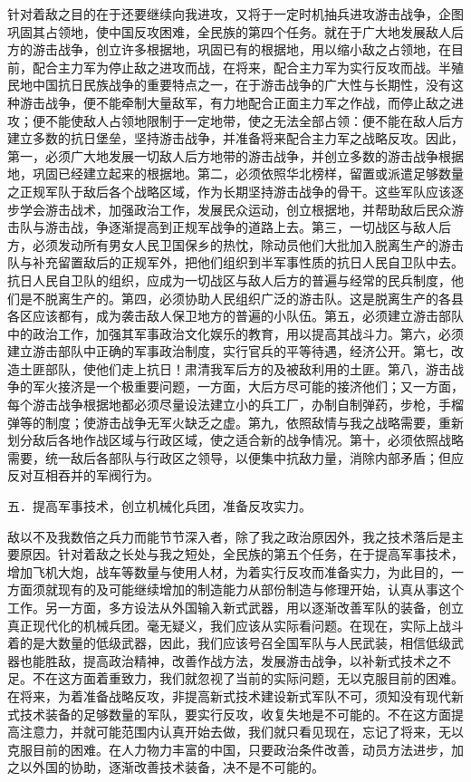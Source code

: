 针对着敌之目的在于还要继续向我进攻，又将于一定时机抽兵进攻游击战争，企图巩固其占领地，使中国反攻困难，全民族的第四个任务。就在于广大地发展敌人后方的游击战争，创立许多根据地，巩固已有的根据地，用以缩小敌之占领地，在目前，配合主力军为停止敌之进攻而战，在将来，配合主力军为实行反攻而战。半殖民地中国抗日民族战争的重要特点之一，在于游击战争的广大性与长期性，没有这种游击战争，便不能牵制大量敌军，有力地配合正面主力军之作战，而停止敌之进攻；便不能使敌人占领地限制于一定地带，使之无法全部占领：便不能在敌人后方建立多数的抗日堡垒，坚持游击战争，并准备将来配合主力军之战略反攻。因此，第一，必须广大地发展一切敌人后方地带的游击战争，并创立多数的游击战争根据地，巩固已经建立起来的根据地。第二，必须依照华北榜样，留置或派遣足够数量之正规军队于敌后各个战略区域，作为长期坚持游击战争的骨干。这些军队应该逐步学会游击战术，加强政治工作，发展民众运动，创立根据地，并帮助敌后民众游击队与游击战，争逐渐提高到正规军战争的道路上去。第三，一切战区与敌人后方，必须发动所有男女人民卫国保乡的热忱，除动员他们大批加入脱离生产的游击队与补充留置敌后的正规军外，把他们组织到半军事性质的抗日人民自卫队中去。抗日人民自卫队的组织，应成为一切战区与敌人后方的普遍与经常的民兵制度，他们是不脱离生产的。第四，必须协助人民组织广泛的游击队。这是脱离生产的各县各区应该都有，成为袭击敌人保卫地方的普遍的小队伍。第五，必须建立游击部队中的政治工作，加强其军事政治文化娱乐的教育，用以提高其战斗力。第六，必须建立游击部队中正确的军事政治制度，实行官兵的平等待遇，经济公开。第七，改造土匪部队，使他们走上抗日！肃清我军后方的及被敌利用的土匪。第八，游击战争的军火接济是一个极重要问题，一方面，大后方尽可能的接济他们；又一方面，每个游击战争根据地都必须尽量设法建立小的兵工厂，办制自制弹药，步枪，手榴弹等的制度；使游击战争无军火缺乏之虚。第九，依照敌情与我之战略需要，重新划分敌后各地作战区域与行政区域，使之适合新的战争情况。第十，必须依照战略需要，统一敌后各部队与行政区之领导，以便集中抗敌力量，消除内部矛盾；但应反对互相吞并的军阀行为。

五．提高军事技术，创立机械化兵团，准备反攻实力。

敌以不及我数倍之兵力而能节节深入者，除了我之政治原因外，我之技术落后是主要原因。针对着敌之长处与我之短处，全民族的第五个任务，在于提高军事技术，增加飞机大炮，战车等数量与使用人材，为着实行反攻而准备实力，为此目的，一方面须就现有的及可能继续增加的制造能力从部份制造与修理开始，认真从事这个工作。另一方面，多方设法从外国输入新式武器，用以逐渐改善军队的装备，创立真正现代化的机械兵团。毫无疑义，我们应该从实际看问题。在现在，实际上战斗着的是大数量的低级武器，因此，我们应该号召全国军队与人民武装，相信低级武器也能胜敌，提高政治精神，改善作战方法，发展游击战争，以补新式技术之不足。不在这方面着重致力，我们就忽视了当前的实际问题，无以克服目前的困难。在将来，为着准备战略反攻，非提高新式技术建设新式军队不可，须知没有现代新式技术装备的足够数量的军队，要实行反攻，收复失地是不可能的。不在这方面提高注意力，并就可能范围内认真开始去做，我们就只看见现在，忘记了将来，无以克服目前的困难。在人力物力丰富的中国，只要政治条件改善，动员方法进步，加之以外国的协助，逐渐改善技术装备，决不是不可能的。

